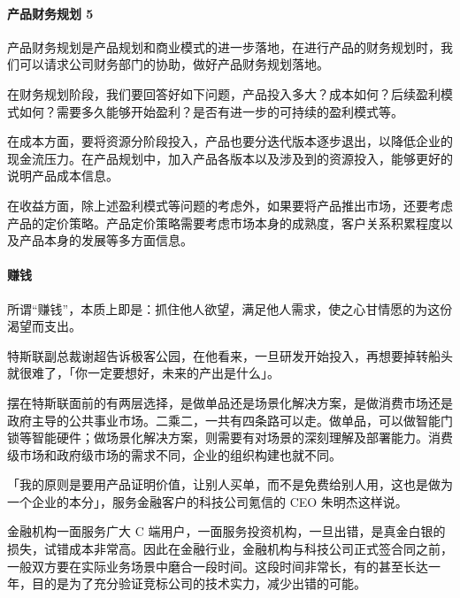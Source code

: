 \documentclass[letterpaper,11pt,english]{sphinxmanual}
\begin{document}
\paragraph{产品财务规划 5\sphinxfootnotemark[105]}
\label{\detokenize{chapter_introduction/money:id2}}%
\begin{footnotetext}[105]\sphinxAtStartFootnote
{}
%
\end{footnotetext}\ignorespaces 
产品财务规划是产品规划和商业模式的进一步落地，在进行产品的财务规划时，我们可以请求公司财务部门的协助，做好产品财务规划落地。

在财务规划阶段，我们要回答好如下问题，产品投入多大？成本如何？后续盈利模式如何？需要多久能够开始盈利？是否有进一步的可持续的盈利模式等。

在成本方面，要将资源分阶段投入，产品也要分迭代版本逐步退出，以降低企业的现金流压力。在产品规划中，加入产品各版本以及涉及到的资源投入，能够更好的说明产品成本信息。

在收益方面，除上述盈利模式等问题的考虑外，如果要将产品推出市场，还要考虑产品的定价策略。产品定价策略需要考虑市场本身的成熟度，客户关系积累程度以及产品本身的发展等多方面信息。


\paragraph{赚钱}
\label{\detokenize{chapter_introduction/money:id3}}
所谓“赚钱”，本质上即是：抓住他人欲望，满足他人需求，使之心甘情愿的为这份渴望而支出。

特斯联副总裁谢超告诉极客公园，在他看来，一旦研发开始投入，再想要掉转船头就很难了，「你一定要想好，未来的产出是什么」。%
\begin{footnote}[106]\sphinxAtStartFootnote
{}
%
\end{footnote}

摆在特斯联面前的有两层选择，是做单品还是场景化解决方案，是做消费市场还是政府主导的公共事业市场。二乘二，一共有四条路可以走。做单品，可以做智能门锁等智能硬件；做场景化解决方案，则需要有对场景的深刻理解及部署能力。消费级市场和政府级市场的需求不同，企业的组织构建也就不同。

「我的原则是要用产品证明价值，让别人买单，而不是免费给别人用，这也是做为一个企业的本分」，服务金融客户的科技公司氪信的
CEO 朱明杰这样说。

金融机构一面服务广大 C
端用户，一面服务投资机构，一旦出错，是真金白银的损失，试错成本非常高。因此在金融行业，金融机构与科技公司正式签合同之前，一般双方要在实际业务场景中磨合一段时间。这段时间非常长，有的甚至长达一年，目的是为了充分验证竞标公司的技术实力，减少出错的可能。
\end{document}
